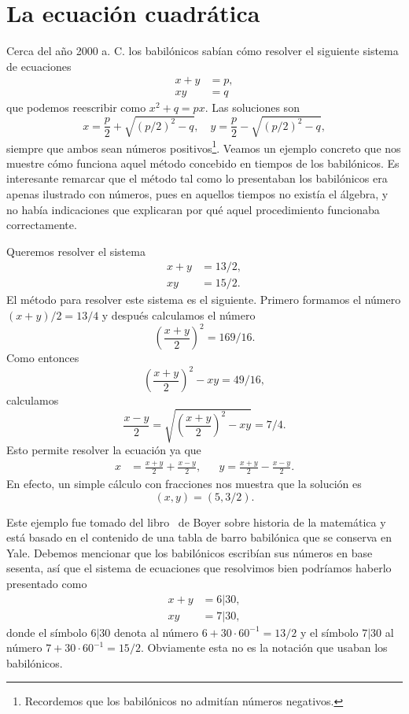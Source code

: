 \section*{La ecuación cuadrática}

Cerca del año 2000 a. C. 
los babilónicos sabían cómo resolver 
el siguiente sistema de ecuaciones
\begin{align*}
	x+y&=p,\\
	xy&=q
\end{align*}
que podemos reescribir como $x^2+q=px$. Las soluciones son 
\[
	x=\frac{p}{2}+\sqrt{(p/2)^2-q},\quad
	y=\frac{p}{2}-\sqrt{(p/2)^2-q},
\]
siempre que ambos sean números positivos\footnote{Recordemos que los
babilónicos no admitían números negativos.}.  Veamos un ejemplo concreto que
nos muestre cómo funciona aquel método concebido en tiempos de los babilónicos. Es interesante remarcar
que el método tal como lo presentaban los babilónicos era apenas ilustrado con
números, pues en aquellos tiempos no existía el álgebra, y no había indicaciones que 
explicaran por qué aquel procedimiento funcionaba correctamente.


\begin{example}
	Queremos resolver el sistema 
	\begin{align*}
		x+y&=13/2,\\
		xy&=15/2.
	\end{align*}
	El método para resolver este sistema es el siguiente. Primero formamos el número $(x+y)/2=13/4$ y 
	después calculamos el número 
	\[
		\left(\frac{x+y}{2}\right)^2=169/16.
	\]
	Como entonces
	\[
		\left(\frac{x+y}{2}\right)^2-xy=49/16,
	\]
	calculamos
	\[
		\frac{x-y}{2}=\sqrt{\left(\frac{x+y}{2}\right)^2-xy}=7/4.
	\]
	Esto permite resolver la ecuación ya que 
	\begin{align*}
		x&=\frac{x+y}{2}+\frac{x-y}{2}, && %
		y=\frac{x+y}{2}-\frac{x-y}{2}.%
	\end{align*}
	En efecto, un simple cálculo con fracciones nos muestra que la solución 
	es 
	\[
		(x,y)=(5,3/2).
	\]
	
	Este ejemplo fue tomado del libro~\cite{MR1094813} de Boyer sobre historia
	de la matemática y está basado en el contenido de una tabla de barro
	babilónica que se conserva en Yale.  Debemos mencionar que los babilónicos
	escribían sus números en base sesenta, así que el sistema de ecuaciones que
	resolvimos bien podríamos haberlo presentado como 
	\begin{align*}
	x+y&=6|30,\\
	xy&=7|30,
\end{align*}
donde el símbolo $6|30$ denota al número $6+30\cdot 60^{-1}=13/2$ y el símbolo
$7|30$ al número $7+30\cdot 60^{-1}=15/2$. Obviamente esta no es la notación
que usaban los babilónicos.
\end{example}


